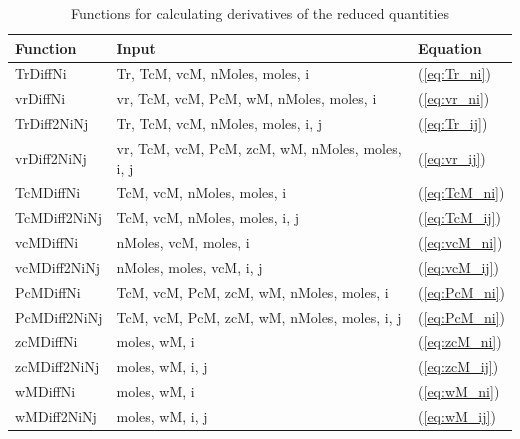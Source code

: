 \documentclass[english]{../thermomemo/thermomemo}
\numberwithin{equation}{section}
\newcommand*{\reff}[1]{(\ref{#1})}
\begin{document}
\begin{table}[t]
\begin{center}
\caption{Functions for calculating derivatives of the reduced quantities}
\label{tab:functionsCrit}
\begin{tabular}{l l l}
\hline%
Function 	& Input   & Equation \\
\hline
TrDiffNi	& Tr, TcM, vcM, nMoles, moles, i	& \reff{eq:Tr_ni} \\
vrDiffNi	& vr, TcM, vcM, PcM, wM, nMoles, moles, i & \reff{eq:vr_ni} \\
TrDiff2NiNj	& Tr, TcM, vcM, nMoles, moles, i, j	& \reff{eq:Tr_ij} \\
vrDiff2NiNj	& vr, TcM, vcM, PcM, zcM, wM, nMoles, moles, i, j	& \reff{eq:vr_ij} \\

TcMDiffNi	& TcM, vcM, nMoles, moles, i	& \reff{eq:TcM_ni} \\
TcMDiff2NiNj	& TcM, vcM, nMoles, moles, i, j	& \reff{eq:TcM_ij} \\
vcMDiffNi	& nMoles, vcM, moles, i	& \reff{eq:vcM_ni} \\
vcMDiff2NiNj	& nMoles, moles, vcM, i, j	& \reff{eq:vcM_ij} \\
PcMDiffNi	& TcM, vcM, PcM, zcM, wM, nMoles, moles, i	& \reff{eq:PcM_ni} \\
PcMDiff2NiNj	& TcM, vcM, PcM, zcM, wM, nMoles, moles, i, j	& \reff{eq:PcM_ni} \\
zcMDiffNi	& moles, wM, i	& \reff{eq:zcM_ni} \\
zcMDiff2NiNj	& moles, wM, i, j	& \reff{eq:zcM_ij} \\
wMDiffNi	& moles, wM, i	& \reff{eq:wM_ni} \\
wMDiff2NiNj	& moles, wM, i, j	& \reff{eq:wM_ij} \\
\hline
\end{tabular}
\end{center}
\end{table}
\end{document}
